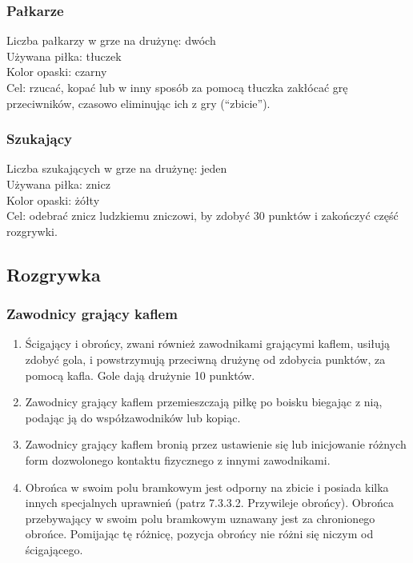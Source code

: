 \documentclass[12pt]{article}
\begin{document}
\subsubsection{Pałkarze}
Liczba pałkarzy w grze na drużynę: dwóch \\
Używana piłka: tłuczek \\
Kolor opaski: czarny \\
Cel: rzucać, kopać lub w inny sposób za pomocą tłuczka zakłócać grę
przeciwników, czasowo eliminując ich z gry (``zbicie'').

\subsubsection{Szukający}
Liczba szukających w grze na drużynę: jeden \\
Używana piłka: znicz \\
Kolor opaski: żółty \\
Cel: odebrać znicz ludzkiemu zniczowi, by zdobyć 30 punktów i zakończyć
część rozgrywki.

\subsection{Rozgrywka}

\subsubsection{Zawodnicy grający kaflem}
\begin{enumerate}
\item Ścigający i obrońcy, zwani również zawodnikami grającymi kaflem,
  usiłują zdobyć gola, i powstrzymują przeciwną drużynę od zdobycia
  punktów, za pomocą kafla. Gole dają drużynie 10 punktów.

\item Zawodnicy grający kaflem przemieszczają piłkę po boisku biegając z
nią, podając ją do współzawodników lub kopiąc.

\item Zawodnicy grający kaflem bronią przez ustawienie się lub inicjowanie
różnych form dozwolonego kontaktu fizycznego z innymi zawodnikami.

\item Obrońca w swoim polu bramkowym jest odporny na zbicie i posiada kilka
innych specjalnych uprawnień (patrz 7.3.3.2. Przywileje obrońcy).
Obrońca przebywający w swoim polu bramkowym uznawany jest za chronionego
obrońce. Pomijając tę różnicę, pozycja obrońcy nie różni się niczym od
ścigającego.
\end{enumerate}
\end{document}
